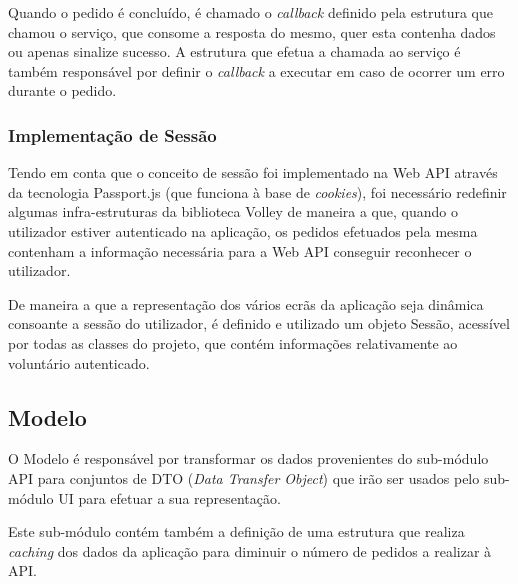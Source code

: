 \medskip

Quando o pedido é concluído, é chamado o \textit{callback} definido pela estrutura que chamou o serviço, que consome a resposta do mesmo, quer esta contenha dados ou apenas sinalize sucesso. A estrutura que efetua a chamada ao serviço é também responsável por definir o \textit{callback} a executar em caso de ocorrer um erro durante o pedido.


\subsubsection{Implementação de Sessão}

Tendo em conta que o conceito de sessão foi implementado na Web API através da tecnologia Passport.js (que funciona à base de \textit{cookies}), foi necessário redefinir algumas infra-estruturas da biblioteca Volley de maneira a que, quando o utilizador estiver autenticado na aplicação, os pedidos efetuados pela mesma contenham a informação necessária para a Web API conseguir reconhecer o utilizador.

\medskip

De maneira a que a representação dos vários ecrãs da aplicação seja dinâmica consoante a sessão do utilizador, é definido e utilizado um objeto Sessão, acessível por todas as classes do projeto, que contém informações relativamente ao voluntário autenticado.

\subsection{Modelo}

O Modelo é responsável por transformar os dados provenientes do sub-módulo API para conjuntos de DTO (\textit{Data Transfer Object}) que irão ser usados pelo sub-módulo UI para efetuar a sua representação.

\medskip

Este sub-módulo contém também a definição de uma estrutura que realiza \textit{caching} dos dados da aplicação para diminuir o número de pedidos a realizar à API.